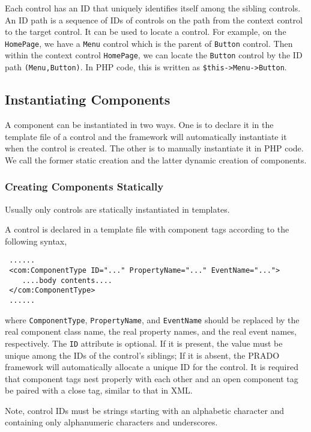 \documentclass{book}
\begin{document}
Each control has an ID that uniquely identifies itself among the
sibling controls. An ID path is a sequence of IDs of controls on
the path from the context control to the target control. It can be
used to locate a control. For example, on the \verb|HomePage|, we
have a \verb|Menu| control which is the parent of \verb|Button|
control. Then within the context control \verb|HomePage|, we can
locate the \verb|Button| control by the ID path
\verb|(Menu,Button)|. In PHP code, this is written as
\verb|$this->Menu->Button|.


\subsection{Instantiating Components}

A component can be instantiated in two ways. One is to declare it
in the template file of a control and the framework will
automatically instantiate it when the control is created. The
other is to manually instantiate it in PHP code. We call the
former static creation and the latter dynamic creation of
components.


\subsubsection{Creating Components Statically}

Usually only controls are statically instantiated in templates.

A control is declared in a template file with component tags
according to the following syntax,
\begin{verbatim}
 ......
 <com:ComponentType ID="..." PropertyName="..." EventName="...">
    ....body contents....
 </com:ComponentType>
 ......
\end{verbatim}
where \verb|ComponentType|, \verb|PropertyName|, and
\verb|EventName| should be replaced by the real component class
name, the real property names, and the real event names,
respectively. The \verb|ID| attribute is optional. If it is
present, the value must be unique among the IDs of the control's
siblings; If it is absent, the PRADO framework will automatically
allocate a unique ID for the control. It is required that
component tags nest properly with each other and an open component
tag be paired with a close tag, similar to that in XML.


Note, control IDs must be strings starting with an alphabetic
character and containing only alphanumeric characters and
underscores.
\end{document}
